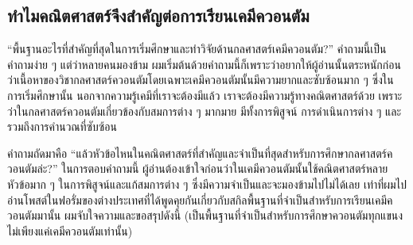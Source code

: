 \subsection{ทำไมคณิตศาสตร์จึงสำคัญต่อการเรียนเคมีควอนตัม}

\enquote{พื้นฐานอะไรที่สำคัญที่สุดในการเริ่มศึกษาและทำวิจัยด้านกลศาสตร์เคมีควอนตัม?} คำถามนี้เป็นคำถามง่าย ๆ แต่ว่าหลายคนมองข้าม
ผมเริ่มต้นด้วยคำถามนี้ก็เพราะว่าอยากให้ผู้อ่านนั้นตระหนักก่อนว่าเนื้อหาของวิชากลศาสตร์ควอนตัมโดยเฉพาะเคมีควอนตัมนั้นมีความยากและซับซ้อนมาก ๆ
ซึ่งในการเริ่มศึกษานั้น นอกจากความรู้เคมีที่เราจะต้องมีแล้ว เราจะต้องมีความรู้ทางคณิตศาสตร์ด้วย เพราะว่าในกลศาสตร์ควอนตัมเกี่ยวข้องกับสมการต่าง ๆ
มากมาย มีทั้งการพิสูจน์ การดำเนินการต่าง ๆ และรวมถึงการคำนวณที่ซับซ้อน

คำถามถัดมาคือ \enquote{แล้วหัวข้อไหนในคณิตศาสตร์ที่สำคัญและจำเป็นที่สุดสำหรับการศึกษากลศาสตร์ควอนตัมล่ะ?} ในการตอบคำถามนี้
ผู้อ่านต้องเข้าใจก่อนว่าในเคมีควอนตัมนั้นใช้คณิตศาสตร์หลายหัวข้อมาก ๆ ในการพิสูจน์และแก้สมการต่าง ๆ ซึ่งมีความจำเป็นและจะมองข้ามไปไม่ได้เลย
เท่าที่ผมไปอ่านโพสต์ในฟอรั่มของต่างประเทศที่ได้พูดคุยกันเกี่ยวกับสกิลพื้นฐานที่จำเป็นสำหรับการเรียนเคมีควอนตัมมานั้น ผมจับใจความและขอสรุปดังนี้
(เป็นพื้นฐานที่จำเป็นสำหรับการศึกษาควอนตัมทุกแขนง ไม่เพียงแค่เคมีควอนตัมเท่านั้น)

